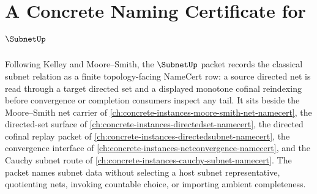 \chapter{A Concrete Naming Certificate for $\SubnetUp$}
\label{ch:concrete-instances-subnet-namecert}

Following Kelley and Moore--Smith, the $\SubnetUp$ packet records the classical subnet relation as a finite topology-facing NameCert row: a source directed net is read through a target directed set and a displayed monotone cofinal reindexing before convergence or completion consumers inspect any tail. It sits beside the Moore--Smith net carrier of \autoref{ch:concrete-instances-moore-smith-net-namecert}, the directed-set surface of \autoref{ch:concrete-instances-directedset-namecert}, the directed cofinal replay packet of \autoref{ch:concrete-instances-directedsubnet-namecert}, the convergence interface of \autoref{ch:concrete-instances-netconvergence-namecert}, and the Cauchy subnet route of \autoref{ch:concrete-instances-cauchy-subnet-namecert}. The packet names subnet data without selecting a host subnet representative, quotienting nets, invoking countable choice, or importing ambient completeness.

